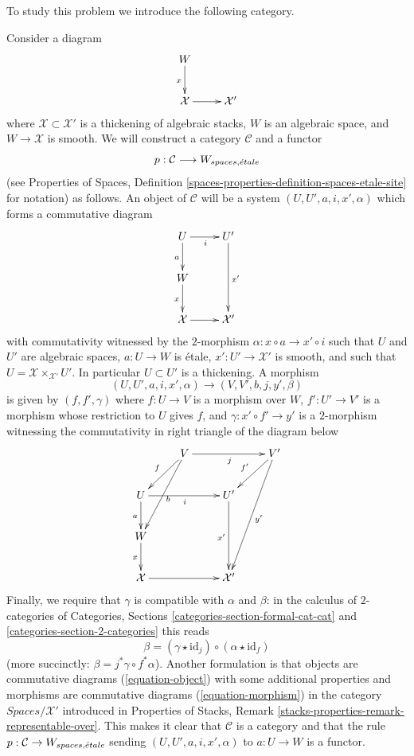 \medskip\noindent
To study this problem we introduce the following category.

\begin{remark}
\label{remark-gerbe-of-lifts}
Consider a diagram
$$
\xymatrix{
W \ar[d]_x \\
\mathcal{X} \ar[r] & \mathcal{X}'
}
$$
where $\mathcal{X} \subset \mathcal{X}'$ is a thickening of algebraic stacks,
$W$ is an algebraic space, and $W \to \mathcal{X}$ is smooth.
We will construct a category $\mathcal{C}$ and a functor
$$
p : \mathcal{C} \longrightarrow W_{spaces, {\acute{e}tale}}
$$
(see Properties of Spaces, Definition
\ref{spaces-properties-definition-spaces-etale-site} for notation)
as follows. An object of $\mathcal{C}$ will be a system
$(U, U', a, i, x', \alpha)$
which forms a commutative diagram
\begin{equation}
\label{equation-object}
\vcenter{
\xymatrix{
U \ar[d]_a \ar[r]_i & U' \ar[dd]^{x'} \\
W \ar[d]_x & \\
\mathcal{X} \ar[r] & \mathcal{X}'
}
}
\end{equation}
with commutativity witnessed by the $2$-morphism
$\alpha : x \circ a \to x' \circ i$ such that
$U$ and $U'$ are algebraic spaces,
$a : U \to W$ is \'etale, $x' : U' \to \mathcal{X}'$ is smooth,
and such that $U = \mathcal{X} \times_{\mathcal{X}'} U'$.
In particular $U \subset U'$ is a thickening.
A morphism
$$
(U, U', a, i, x', \alpha) \to (V, V', b, j, y', \beta)
$$
is given by $(f, f', \gamma)$ where $f : U \to V$ is a morphism
over $W$, $f' : U' \to V'$ is a morphism whose restriction
to $U$ gives $f$, and $\gamma : x' \circ f' \to y'$ is a $2$-morphism
witnessing the commutativity in right triangle of the diagram below
\begin{equation}
\label{equation-morphism}
\vcenter{
\xymatrix{
& V \ar[ld]_f \ar[ldd]^b \ar[rr]_j & & V' \ar[ld]_{f'} \ar[lddd]^{y'} \\
U \ar[d]_a \ar[rr]_i & & U' \ar[dd]_{x'} \\
W \ar[d]_x & \\
\mathcal{X} \ar[rr] & & \mathcal{X}'
}
}
\end{equation}
Finally, we require that $\gamma$ is compatible with $\alpha$ and $\beta$:
in the calculus of $2$-categories of Categories, Sections
\ref{categories-section-formal-cat-cat} and
\ref{categories-section-2-categories} this reads
$$
\beta = (\gamma \star \text{id}_j) \circ (\alpha \star \text{id}_f)
$$
(more succinctly: $\beta = j^*\gamma \circ f^*\alpha$).
Another formulation is that objects are commutative diagrams
(\ref{equation-object}) with some additional properties and
morphisms are commutative diagrams
(\ref{equation-morphism}) in the category $\textit{Spaces}/\mathcal{X}'$
introduced in Properties of Stacks, Remark
\ref{stacks-properties-remark-representable-over}.
This makes it clear that $\mathcal{C}$ is a category
and that the rule $p : \mathcal{C} \to W_{spaces, {\acute{e}tale}}$
sending $(U, U', a, i, x', \alpha)$ to $a : U \to W$
is a functor.
\end{remark}

